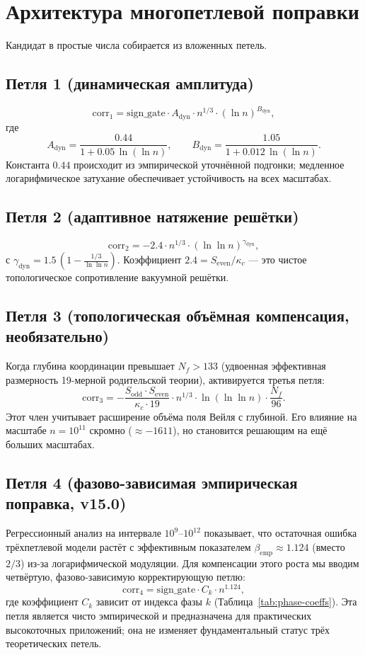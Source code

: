 \documentclass[12pt,a4paper]{article}
\newcommand{\kappac}{\kappa_c}
\newcommand{\Sodd}{S_{\mathrm{odd}}}
\newcommand{\Seven}{S_{\mathrm{even}}}
\begin{document}
	\section{Архитектура многопетлевой поправки}
	\label{sec:multiloop}
	Кандидат в простые числа собирается из вложенных петель.
	
	\subsection{Петля 1 (динамическая амплитуда)}
	\[
	\mathrm{corr}_1 = \mathrm{sign\_gate} \cdot A_{\mathrm{dyn}} \cdot n^{1/3} \cdot (\ln n)^{B_{\mathrm{dyn}}},
	\]
	где
	\[
	A_{\mathrm{dyn}} = \frac{0.44}{1 + 0.05\,\ln(\ln n)}, \qquad
	B_{\mathrm{dyn}} = \frac{1.05}{1 + 0.012\,\ln(\ln n)}.
	\]
	Константа $0.44$ происходит из эмпирической уточнённой подгонки; медленное логарифмическое затухание обеспечивает устойчивость на всех масштабах.
	
	\subsection{Петля 2 (адаптивное натяжение решётки)}
	\[
	\mathrm{corr}_2 = -2.4 \cdot n^{1/3} \cdot (\ln\ln n)^{\gamma_{\mathrm{dyn}}},
	\]
	с $\gamma_{\mathrm{dyn}} = 1.5\,(1 - \frac{1/3}{\ln\ln n})$. Коэффициент $2.4 = \Seven/\kappac$ — это чистое топологическое сопротивление вакуумной решётки.
	
	\subsection{Петля 3 (топологическая объёмная компенсация, необязательно)}
	Когда глубина координации превышает $N_f > 133$ (удвоенная эффективная размерность 19-мерной родительской теории), активируется третья петля:
	\[
	\mathrm{corr}_3 = -\frac{\Sodd\cdot\Seven}{\kappac\cdot 19} \cdot n^{1/3} \cdot \ln(\ln\ln n) \cdot \frac{N_f}{96}.
	\]
	Этот член учитывает расширение объёма поля Вейля с глубиной. Его влияние на масштабе $n=10^{11}$ скромно ($\approx -1611$), но становится решающим на ещё больших масштабах.
	
	\subsection{Петля 4 (фазово-зависимая эмпирическая поправка, v15.0)}
	Регрессионный анализ на интервале $10^9$--$10^{12}$ показывает, что остаточная ошибка трёхпетлевой модели растёт с эффективным показателем $\beta_{\mathrm{emp}} \approx 1.124$ (вместо $2/3$) из-за логарифмической модуляции. Для компенсации этого роста мы вводим четвёртую, фазово-зависимую корректирующую петлю:
	\[
	\mathrm{corr}_4 = \mathrm{sign\_gate} \cdot C_k \cdot n^{1.124},
	\]
	где коэффициент $C_k$ зависит от индекса фазы $k$ (Таблица~\ref{tab:phase-coeffs}). Эта петля является чисто эмпирической и предназначена для практических высокоточных приложений; она не изменяет фундаментальный статус трёх теоретических петель.
	
\end{document}
